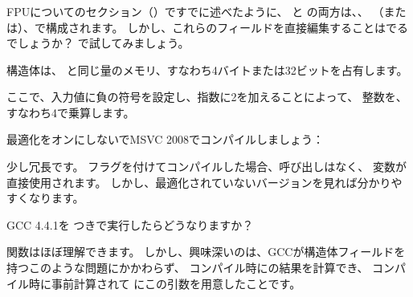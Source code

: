 ﻿\subsubsection{\WorkingWithFloatAsWithStructSubSubSectionName}
\label{sec:floatasstruct}

FPUについてのセクション（）ですでに述べたように、
\Tfloat と \Tdouble の両方は、、
（または）、で構成されます。 
しかし、これらのフィールドを直接編集することはでるでしょうか？ \Tfloat で試してみましょう。





構造体は、 \Tfloat と同じ量のメモリ、すなわち4バイトまたは32ビットを占有します。

ここで、入力値に負の符号を設定し、指数に2を加えることによって、
整数を、すなわち4で乗算します。

最適化をオンにしないでMSVC 2008でコンパイルしましょう：



少し冗長です。
\Ox フラグを付けてコンパイルした場合、呼び出しはなく、
変数が直接使用されます。 
しかし、最適化されていないバージョンを見れば分かりやすくなります。

GCC 4.4.1を \Othree つきで実行したらどうなりますか？



\ttf 関数はほぼ理解できます。 しかし、興味深いのは、GCCが構造体フィールドを持つこのような問題にかかわらず、
コンパイル時にの結果を計算でき、
コンパイル時に事前計算されて \printf にこの引数を用意したことです。
